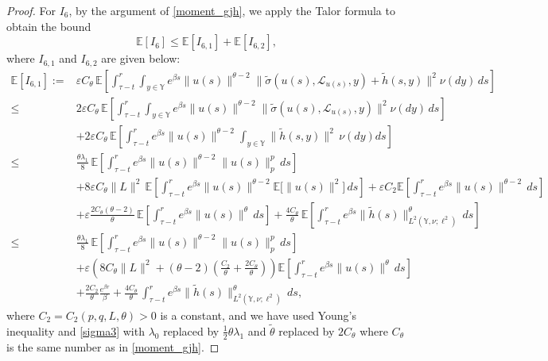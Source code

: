 \documentclass[11pt]{article}
\numberwithin{equation}{section}
\theoremstyle{plain}
\begin{document}
\begin{proof}
 For $I_6$, 
 by the argument of 
 \eqref{moment_gjh},
 we apply the Talor formula 
  to obtain the bound
 \[
 \mathbb{E}[I_6] \le \mathbb{E}[I_{6,1}] + \mathbb{E}[I_{6,2}],
 \]
 where $  I_{6,1}  $ and $ I_{6,2} $ 
 are given below:
 \begin{align}\label{moment_gjg}
	\mathbb{E}[I_{6,1}]
	:= & 
	\varepsilon C_\theta  \,
	\mathbb{E}\left[ 
	\int_{\tau-t}^{r}
	\int_{y\in\mathbb{Y}
	}
	e^{\beta s}
	\|u(s)\|^{\theta-2}
	\big\|
	\widetilde{\sigma}(u(s), \mathcal{L}_{u(s)}, y)
	+ \widetilde{h}(s,y)
	\big\|^2
	\nu(dy) \, ds
	\right]                                        \nonumber\\
	\le & 
	2 \varepsilon C_\theta \,
	\mathbb{E}\left[ 
	\int_{\tau-t}^{r}
	\int_{y\in\mathbb{Y}
	 }
	e^{\beta s}
	\|u(s)\|^{\theta-2}
	\big\|
	\widetilde{\sigma}(u(s), \mathcal{L}_{u(s)}, y)
	\big\|^2
	\nu(dy) \, ds
	\right]                                        \nonumber\\
	& + 2 \varepsilon C_\theta \,
	\mathbb{E}\left[
	\int_{\tau-t}^{r}
	e^{\beta s}
	\|u(s)\|^{\theta-2}
	\int_{y\in\mathbb{Y}}
	\|\widetilde{h}(s,y)\|^2 \,  \nu (dy) ds
	\right]                                      \nonumber\\[1ex]
	\le & 
	\frac{\theta \lambda_1}{8} \,
	\mathbb{E}\left[
	\int_{\tau-t}^{r}
	e^{\beta s}
	\|u(s)\|^{\theta-2} \|u(s)\|_p^p \, ds
	\right]  \nonumber\\
	& 
	+ 8 \varepsilon C_\theta \|L\|^2 \,
	\mathbb{E}\left[
	\int_{\tau-t}^{r}
	e^{\beta s}
	\|u(s)\|^{\theta-2}
	\mathbb{E}\bigl[\|u(s)\|^2\bigr] \, ds
	\right]                                      
	+ \varepsilon C_2   
	\mathbb{E}\left[
	\int_{\tau-t}^{r}
	e^{\beta s} \|u(s)\|^{\theta-2} \, ds
	\right]  \nonumber\\
	& + \varepsilon \frac{2 C_\theta (\theta-2)}{\theta} \,
	\mathbb{E}\left[
	\int_{\tau-t}^{r}
	e^{\beta s} \|u(s)\|^{\theta} \, ds
	\right]
	+ \frac{4 C_\theta}{\theta} \,
	\mathbb{E}\left[
	\int_{\tau-t}^{r}
	e^{\beta s} \|\widetilde{h}(s)\|^{\theta}
	_{L^2(\mathbb{Y}, \nu; \ell^2) 
	} \, ds
	\right]                                      \nonumber\\[1ex]
	\le &
	\frac{\theta \lambda_1}{8} \,
	\mathbb{E}\left[
	\int_{\tau-t}^{r}
	e^{\beta s} \|u(s)\|^{\theta-2} \|u(s)\|_p^p \, ds
	\right]  \nonumber\\
	& + \varepsilon \left(
	8 C_\theta \|L\|^2
	+ (\theta-2)
	\left(
	\frac{C_2}{\theta}
	+ \frac{2 C_\theta}{\theta}
	\right)
	\right)
	\mathbb{E}\left[
	\int_{\tau-t}^{r}
	e^{\beta s} \|u(s)\|^{\theta} \, ds
	\right]                                      \nonumber\\
	& + {\frac{ 2C_2}{\theta}}
	\frac{e^{\beta r}}{\beta}
	+ \frac{4 C_\theta}{\theta} \,
	\int_{\tau-t}^{r}
	e^{\beta s} \|\widetilde{h}(s)\|^{\theta}
	_{L^2(\mathbb{Y}, \nu; \ell^2) 
	}  \, ds ,
\end{align}
where $C_2=C_2 (p,q, L, \theta)>0
$ is a constant, and  we have used 
  Young's inequality and \eqref{sigma3} with
  $\lambda_0$ replaced by
  ${\frac 12} \theta \lambda_1$
  and  
$\tilde{\theta}$ replaced by 
$ 2C_{\theta}$ where $C_{\theta}$ is the same  
number as in \eqref{moment_gjh}.




\end{proof}
\end{document}
